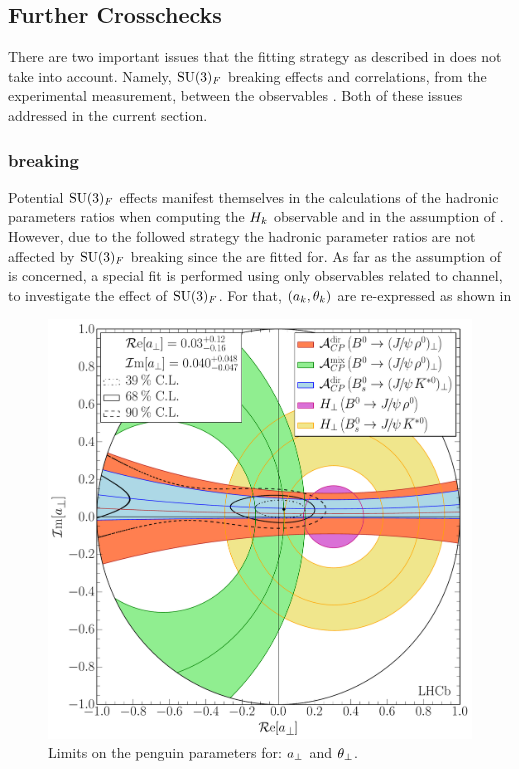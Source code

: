 \subsection{Further Crosschecks}
There are two important issues that the fitting strategy as described in 
does not take into account. Namely, $\mathrm{SU}(3)_F$ breaking effects and correlations, from the
experimental measurement, between the observables . Both of these issues
addressed in the current section.

\subsubsection{\grpsuthree breaking}
\label{su3_breaking}
Potential $\mathrm{SU}(3)_F$ effects manifest themselves in the calculations of the hadronic parameters ratios
when computing the $H_{k}$ observable and in the assumption of . However, due to the
followed strategy the hadronic parameter ratios are not affected by $\mathrm{SU}(3)_F$ breaking since the are fitted for.
As far as the assumption of  is concerned, a special fit is performed using only observables
related to \BdJpsiRho channel, to investigate the effect of $\mathrm{SU}(3)_F$. For that, $(a_k,\theta_k)$
are re-expressed as shown in 

\begin{figure}[!t]
  \centering
  \includegraphics[trim=0.0cm 0.0cm 0.0cm 0.0cm, clip=true,scale=0.4]{Figures/Chapter5/Penguin_Contribution_Re_vs_Im_allB2VV_Perp_withH.pdf}
  \caption{Limits on the penguin parameters for: $a_{\perp}$ and $\theta_{\perp}$.}
  \label{pengPlot_perp}
\end{figure}

